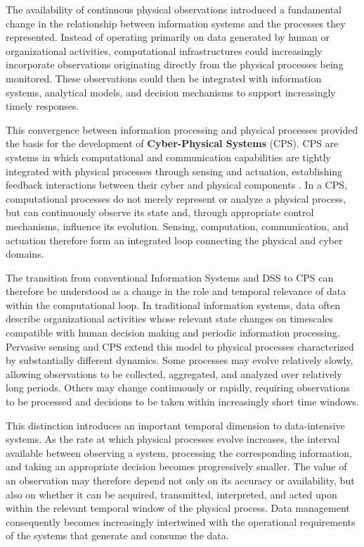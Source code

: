 The availability of continuous physical observations introduced a fundamental change in the relationship between information systems and the processes they represented. Instead of operating primarily on data generated by human or organizational activities, computational infrastructures could increasingly incorporate observations originating directly from the physical processes being monitored. These observations could then be integrated with information systems, analytical models, and decision mechanisms to support increasingly timely responses.

This convergence between information processing and physical processes provided the basis for the development of \textbf{Cyber-Physical Systems} (CPS). CPS are systems in which computational and communication capabilities are tightly integrated with physical processes through sensing and actuation, establishing feedback interactions between their cyber and physical components \cite{lee2008,nist_cps}. In a CPS, computational processes do not merely represent or analyze a physical process, but can continuously observe its state and, through appropriate control mechanisms, influence its evolution. Sensing, computation, communication, and actuation therefore form an integrated loop connecting the physical and cyber domains.

The transition from conventional Information Systems and DSS to CPS can therefore be understood as a change in the role and temporal relevance of data within the computational loop. In traditional information systems, data often describe organizational activities whose relevant state changes on timescales compatible with human decision making and periodic information processing. Pervasive sensing and CPS extend this model to physical processes characterized by substantially different dynamics. Some processes may evolve relatively slowly, allowing observations to be collected, aggregated, and analyzed over relatively long periods. Others may change continuously or rapidly, requiring observations to be processed and decisions to be taken within increasingly short time windows.

This distinction introduces an important temporal dimension to data-intensive systems. As the rate at which physical processes evolve increases, the interval available between observing a system, processing the corresponding information, and taking an appropriate decision becomes progressively smaller. The value of an observation may therefore depend not only on its accuracy or availability, but also on whether it can be acquired, transmitted, interpreted, and acted upon within the relevant temporal window of the physical process. Data management consequently becomes increasingly intertwined with the operational requirements of the systems that generate and consume the data.

